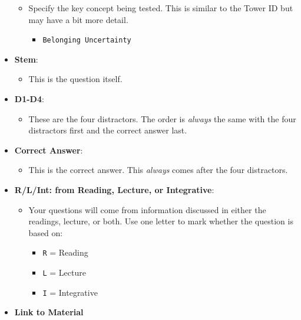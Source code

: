 \documentclass[
]{article}
\providecommand{\tightlist}{%
  \setlength{\itemsep}{0pt}\setlength{\parskip}{0pt}}
\begin{document}
\begin{itemize}
  \begin{itemize}
  \tightlist
  \item
    Specify the key concept being tested. This is similar to the Tower ID but may have a bit more detail.

    \begin{itemize}
    \tightlist
    \item
      \texttt{Belonging\ Uncertainty}
    \end{itemize}
  \end{itemize}
\item
  \textbf{Stem}:

  \begin{itemize}
  \tightlist
  \item
    This is the question itself.
  \end{itemize}
\item
  \textbf{D1-D4}:

  \begin{itemize}
  \tightlist
  \item
    These are the four distractors. The order is \emph{always} the same with the four distractors first and the correct answer last.
  \end{itemize}
\item
  \textbf{Correct Answer}:

  \begin{itemize}
  \tightlist
  \item
    This is the correct answer. This \emph{always} comes after the four distractors.
  \end{itemize}
\item
  \textbf{R/L/Int: from Reading, Lecture, or Integrative}:

  \begin{itemize}
  \tightlist
  \item
    Your questions will come from information discussed in either the readings, lecture, or both. Use one letter to mark whether the question is based on:

    \begin{itemize}
    \tightlist
    \item
      \texttt{R} = Reading\\
    \item
      \texttt{L} = Lecture\\
    \item
      \texttt{I} = Integrative
    \end{itemize}
  \end{itemize}
\item
  \textbf{Link to Material}


\end{itemize}
\end{document}
